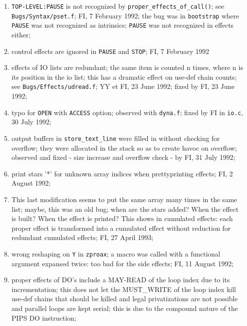 \begin{enumerate}
  \item \verb+TOP-LEVEL:PAUSE+ is not recognized by 
	\verb+proper_effects_of_call()+;
	see \verb+Bugs/Syntax/pset.f+; FI, 7 February 1992;
	the bug was in \verb+bootstrap+ where \verb+PAUSE+ was not
	recognized as intrinsics; \verb+PAUSE+ was not recognized
	in effects either;

  \item control effects are ignored in \verb+PAUSE+ and \verb+STOP+;
	FI, 7 February 1992

  \item effects of IO lists are redundant; the same item is counted
	n times, where n is its position in the io list;
	this has a dramatic effect on use-def chain counts;
	see \verb+Bugs/Effects/udread.f+; YY et FI, 23 June 1992;
	fixed by FI, 23 June 1992;

  \item typo for \verb+OPEN+ with \verb+ACCESS+ option; observed
	with \verb+dyna.f+; fixed by FI in \verb+io.c+, 30 July 1992;

  \item output buffers in \verb+store_text_line+ were filled in without
	checking for overflow; they were allocated in the stack so
	as to create havoc on overflow; observed and fixed - size
	increase and overflow check - by FI,
	31 July 1992;

  \item print stars '*' for unknown array indices when prettyprinting
	effects; FI, 2 August 1992;

  \item This last modification seems to put the same array many times in
	the same list; maybe, this was an old bug; when are the stars
	added? When the effect is built? When the effect is printed?
	This shows in cumulated effects: each proper effect is
	transformed into a cumulated effect without reduction for
	redundant cumulated effects; FI, 27 April 1993;

  \item wrong reshaping on \verb+Y+ in \verb+zproax+; a macro was
	called with a functional argument expansed twice: too bad
	for the side effects; FI, 11 August 1992;

  \item proper effects of DO's include a MAY-READ of the loop index
	due to its incrementation; this does not let the MUST_WRITE
	of the loop index kill use-def chains that should be killed
	and legal privatizations are not possible and parallel loops
	are kept serial; this is due to the compound nature of the PIPS DO
	instruction;


\end{enumerate}
